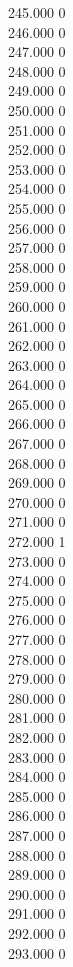 { 245.000	0 \\
 246.000	0 \\
 247.000	0 \\
 248.000	0 \\
 249.000	0 \\
 250.000	0 \\
 251.000	0 \\
 252.000	0 \\
 253.000	0 \\
 254.000	0 \\
 255.000	0 \\
 256.000	0 \\
 257.000	0 \\
 258.000	0 \\
 259.000	0 \\
 260.000	0 \\
 261.000	0 \\
 262.000	0 \\
 263.000	0 \\
 264.000	0 \\
 265.000	0 \\
 266.000	0 \\
 267.000	0 \\
 268.000	0 \\
 269.000	0 \\
 270.000	0 \\
 271.000	0 \\
 272.000	1 \\
 273.000	0 \\
 274.000	0 \\
 275.000	0 \\
 276.000	0 \\
 277.000	0 \\
 278.000	0 \\
 279.000	0 \\
 280.000	0 \\
 281.000	0 \\
 282.000	0 \\
 283.000	0 \\
 284.000	0 \\
 285.000	0 \\
 286.000	0 \\
 287.000	0 \\
 288.000	0 \\
 289.000	0 \\
 290.000	0 \\
 291.000	0 \\
 292.000	0 \\
 293.000	0 \\
}
